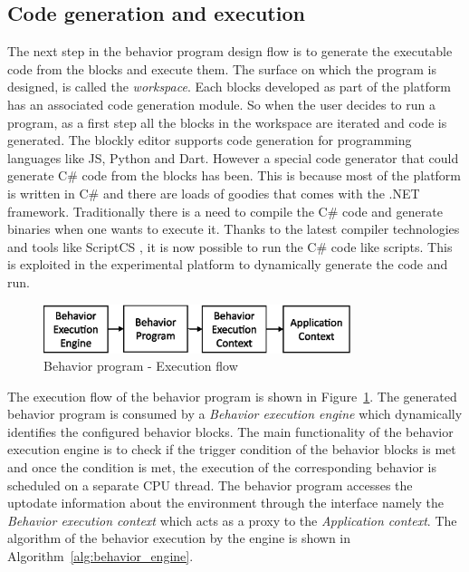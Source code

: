 \subsection{Code generation and execution}
The next step in the behavior program design flow is to generate the executable code from the blocks and execute them. The surface on which the program is designed, is called the \emph{workspace}. Each blocks developed as part of the platform has an associated code generation module. So when the user decides to run a program, as a first step all the blocks in the workspace are iterated and code is generated. The blockly editor supports code generation for programming languages like JS, Python and Dart. However a special code generator that could generate C\# code from the blocks has been. This is because most of the platform is written in C\# and there are loads of goodies that comes with the .NET framework. Traditionally there is a need to compile the C\# code and generate binaries when one wants to execute it. Thanks to the latest compiler technologies and tools like ScriptCS \cite{ScriptCS}, it is now possible to run the C\# code like scripts. This is exploited in the experimental platform to dynamically generate the code and run.
\begin{figure}[H]
\centering
\includegraphics[width=0.8\textwidth]{../thesis/assets/execution_flow.eps}
\caption[Behavior program - Execution flow]{Behavior program - Execution flow}
\label{fig:program_execution}
\end{figure}
 The execution flow of the behavior program is shown in Figure~\ref{fig:program_execution}. The generated behavior program is consumed by a \emph{Behavior execution engine} which dynamically identifies the configured behavior blocks. The main functionality of the behavior execution engine is to check if the trigger condition of the behavior blocks is met and once the condition is met, the execution of the corresponding behavior is scheduled on a separate CPU thread. The behavior program accesses the uptodate information about the environment through the interface namely the \emph{Behavior execution context} which acts as a proxy to the \emph{Application context}. The algorithm of the behavior execution by the engine is shown in Algorithm~\ref{alg:behavior_engine}.

